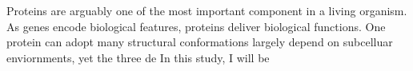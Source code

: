 Proteins are arguably one of the most important component in a living organism. As genes encode biological features, proteins deliver biological functions. One protein can adopt many structural conformations largely depend on subcelluar enviornments, yet the three de     In this study, I will be 